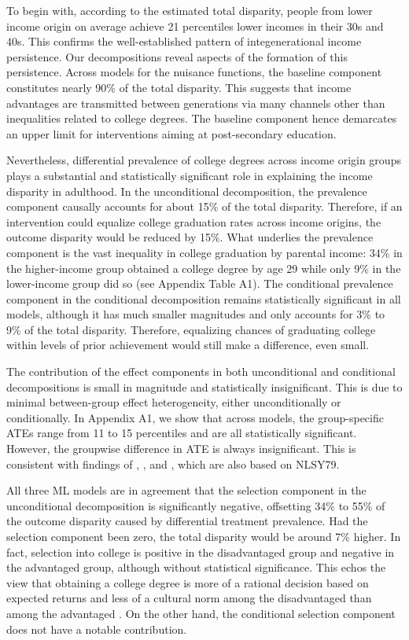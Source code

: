 \documentclass[12pt,a4paper]{article}
\begin{document}
To begin with, according to the estimated total disparity, people from lower income origin on average achieve 21 percentiles lower incomes in their 30s and 40s. This confirms the well-established pattern of integenerational income persistence. Our decompositions reveal aspects of the formation of this persistence. Across models for the nuisance functions, the baseline component constitutes nearly 90\% of the total disparity. This suggests that income advantages are transmitted between generations via many channels other than inequalities related to college degrees. The baseline component hence demarcates an upper limit for interventions aiming at  post-secondary education.

Nevertheless, differential prevalence of college degrees across income origin groups plays a substantial and statistically significant role in explaining the income disparity in adulthood. In the unconditional decomposition, the prevalence component causally accounts for about 15\% of the total disparity. Therefore, if an intervention could equalize college graduation rates across income origins, the outcome disparity would be reduced by 15\%. What underlies the prevalence component is the vast inequality in college graduation by parental income: 34\% in the higher-income group obtained a college degree by age 29 while only 9\% in the lower-income group did so (see Appendix Table A1). The conditional prevalence component in the conditional decomposition remains statistically significant in all models, although it has much smaller magnitudes and only accounts for 3\% to 9\% of the total disparity. Therefore, equalizing chances of graduating college within levels of prior achievement would still make a difference, even small.

The contribution of the effect components in both unconditional and conditional decompositions is small in magnitude and statistically insignificant. This is due to minimal between-group effect heterogeneity, either unconditionally or conditionally. In Appendix A1, we show that across models, the group-specific ATEs range from 11 to 15 percentiles and are all statistically significant. However, the groupwise difference in ATE is always insignificant. This is consistent with findings of \citet{zhou_equalization_2019}, \citet{fiel_great_2020}, and \citet{yu_leveraging_2021}, which are also based on NLSY79. 

All three ML models are in agreement that the selection component in the unconditional decomposition is significantly negative, offsetting 34\% to 55\% of the outcome disparity caused by differential treatment prevalence. Had the selection component been zero, the total disparity would be around 7\% higher. In fact, selection into college is positive in the disadvantaged group and negative in the advantaged group, although without statistical significance. This echos the view that obtaining a college degree is more of a rational decision based on expected returns and less of a cultural norm among the disadvantaged than among the advantaged \citep{mare_social_1980, hout_social_2012}. On the other hand, the conditional selection component does not have a notable contribution. 
\end{document}
